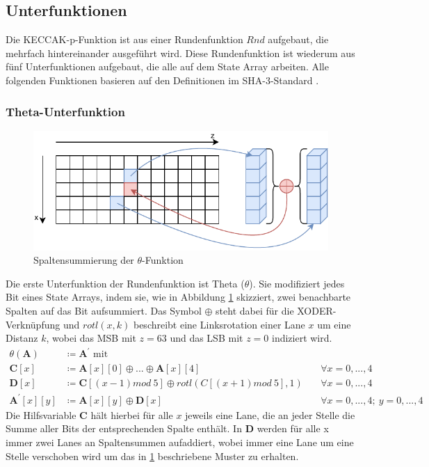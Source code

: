 \subsection{Unterfunktionen}
\label{cha:sha3_unterfunktionen}
Die KECCAK-p-Funktion ist aus einer Rundenfunktion $Rnd$ aufgebaut, die mehrfach hintereinander ausgeführt wird.
Diese Rundenfunktion ist wiederum aus fünf Unterfunktionen aufgebaut, die alle auf dem State Array arbeiten.
Alle folgenden Funktionen basieren auf den Definitionen im SHA-3-Standard \cite{sha3-standard}.

\subsubsection{Theta-Unterfunktion}
\begin{figure}
    \center
    \includegraphics{images/theta.pdf}
    \caption{Spaltensummierung der $\theta$-Funktion}
    \label{fig:definition_theta}
\end{figure}
Die erste Unterfunktion der Rundenfunktion ist Theta ($\theta$). Sie modifiziert jedes Bit eines State Arrays,
indem sie, wie in Abbildung \ref{fig:definition_theta} skizziert, zwei benachbarte Spalten auf das Bit aufsummiert.
Das Symbol $\oplus$ steht dabei für die XODER-Verknüpfung und $rotl(x, k)$ beschreibt eine Linksrotation
einer Lane $x$ um eine Distanz $k$, wobei das MSB mit $z = 63$ und das LSB mit $z = 0$ indiziert wird.
\begin{align*}
    \theta (\textbf{A}) & \coloneq \textbf{A}^\prime \text{ mit } \\
    \textbf{C}[x] & \coloneq \textbf{A}[x][0] \oplus ... \oplus \textbf{A}[x][4] && \forall x = 0,...,4 \\
    \textbf{D}[x] & \coloneq \textbf{C}[(x - 1) mod\ 5] \oplus rotl(C[(x + 1) mod\ 5], 1)\ && \forall x = 0,...,4 \\
    \textbf{A}^\prime[x][y] & \coloneq \textbf{A}[x][y] \oplus \textbf{D}[x]\ && \forall x = 0,...,4;\ y = 0,...,4
\end{align*}
Die Hilfsvariable \textbf{C} hält hierbei für alle $x$ jeweils eine Lane, die an jeder Stelle die Summe aller Bits
der entsprechenden Spalte enthält. In \textbf{D} werden für alle x immer zwei Lanes an Spaltensummen aufaddiert, wobei immer
eine Lane um eine Stelle verschoben wird um das in \ref{fig:definition_theta} beschriebene Muster zu erhalten.


